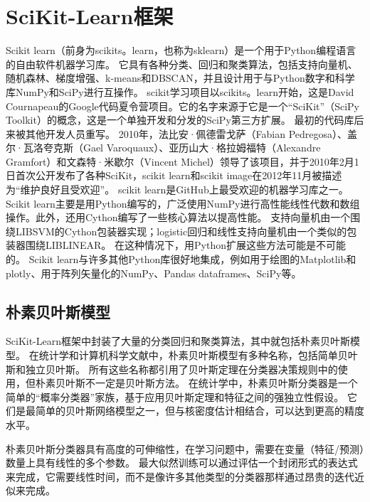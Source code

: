 \section{SciKit-Learn框架}

Scikit learn（前身为scikits。learn，也称为sklearn）是一个用于Python编程语言的自由软件机器学习库\cite{pedregosa2011scikit}。
它具有各种分类、回归和聚类算法，包括支持向量机、随机森林、梯度增强、k-means和DBSCAN，并且设计用于与Python数字和科学库NumPy和SciPy进行互操作。
scikit学习项目以scikits。learn开始，这是David Cournapeau的Google代码夏令营项目。它的名字来源于它是一个“SciKit”（SciPy Toolkit）的概念，这是一个单独开发和分发的SciPy\cite{kramer2016scikit}第三方扩展。
最初的代码库后来被其他开发人员重写。
2010年，法比安·佩德雷戈萨（Fabian Pedregosa）、盖尔·瓦洛夸克斯（Gael Varoquaux）、亚历山大·格拉姆福特（Alexandre Gramfort）和文森特·米歇尔（Vincent Michel）领导了该项目，并于2010年2月1日首次公开发布了各种SciKit，scikit learn和scikit image在2012年11月被描述为“维护良好且受欢迎”\cite{bressert2012scipy}。
scikit learn是GitHub\cite{gonzalez2020state}上最受欢迎的机器学习库之一。
Scikit learn主要是用Python编写的，广泛使用NumPy进行高性能线性代数和数组操作。此外，还用Cython编写了一些核心算法以提高性能。
支持向量机由一个围绕LIBSVM的Cython包装器实现；logistic回归和线性支持向量机由一个类似的包装器围绕LIBLINEAR。
在这种情况下，用Python扩展这些方法可能是不可能的。
Scikit learn与许多其他Python库很好地集成，例如用于绘图的Matplotlib和plotly、用于阵列矢量化的NumPy、Pandas dataframes、SciPy等。

\subsection{朴素贝叶斯模型}

SciKit-Learn框架中封装了大量的分类回归和聚类算法，其中就包括朴素贝叶斯模型。
在统计学和计算机科学文献中，朴素贝叶斯模型有多种名称，包括简单贝叶斯和独立贝叶斯。
所有这些名称都引用了贝叶斯定理在分类器决策规则中的使用，但朴素贝叶斯不一定是贝叶斯方法。
在统计学中，朴素贝叶斯分类器是一个简单的“概率分类器”家族\cite{larranaga2013review}，基于应用贝叶斯定理和特征之间的强独立性假设。
它们是最简单的贝叶斯网络模型之一，但与核密度估计相结合，可以达到更高的精度水平\cite{piryonesi2020role}。

朴素贝叶斯分类器具有高度的可伸缩性，在学习问题中，需要在变量（特征/预测）数量上具有线性的多个参数。
最大似然训练可以通过评估一个封闭形式的表达式来完成\cite{russell2002artificial}，它需要线性时间，而不是像许多其他类型的分类器那样通过昂贵的迭代近似来完成。

